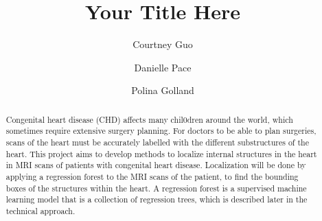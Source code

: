 \documentclass[sigconf,12pt]{acmart}
\begin{document}
\title{Your Title Here}

\author{Courtney Guo}

\author{Danielle Pace}

\author{Polina Golland}


\begin{abstract}
\doublespacing
Congenital heart disease (CHD) affects many chil0dren around the world, which sometimes require extensive surgery planning. For doctors to be able to plan surgeries, scans of the heart must be accurately labelled with the different substructures of the heart. This project aims to develop methods to localize internal structures in the heart in MRI scans of patients with congenital heart disease. Localization will be done by applying a regression forest to the MRI scans of the patient, to find the bounding boxes of the structures within the heart. A regression forest is a supervised machine learning model that is a collection of regression trees, which is described later in the technical approach. %
\end{abstract}


\maketitle

\begin{doublespacing}



\end{doublespacing}



\end{document}
